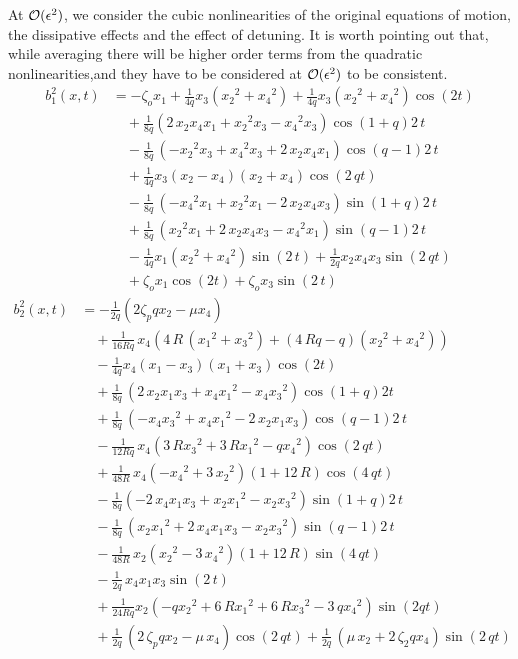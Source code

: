 At $\mathcal{O}(\epsilon^2)$, we consider the cubic nonlinearities of the original equations of motion, the dissipative effects and the effect of detuning. It is worth pointing out that, while averaging there will be higher order terms from the quadratic nonlinearities,and they have to be considered at ${\mathcal{O}}(\epsilon^2)$ to be consistent.
\begin{align*}
b^2_1(x,t) &= -\zeta_o x_1 + \frac{1}{4q} x_3 \left({x_2}^2+{x_4}^2\right) + \frac{1}{4q} {x_3 \left({x_2}^2+{x_4}^2\right)\cos(2t)}\\
&\quad + \frac{1}{8q} {\left(2\,x_2x_4x_1+{x_2}^2 x_3-{x_4}^2 x_3\right) \cos(1 + q)2\,t}\\
&\quad - \frac{1}{8q}\,{ \left(-{x_2}^2 x_3 + {x_4}^2 x_3 + 2\,x_2 x_4 x_1\right) \cos(q-1)2\,t}\\
&\quad + \frac{1}{4q}{x_3 \left(x_2 - x_4\right) \left(x_2 + x_4 \right) \cos(2\,qt)}\\
&\quad - \frac{1}{8q}\,{\left(-{x_4}^2x_1+{x_2}^2x_1 - 2\,x_2 x_4 x_3\right) \sin(1+q)2\,t}\\
&\quad + \frac{1}{8q}\, {\left({x_2}^2 x_1 + 2\, x_2 x_4 x_3 - {x_4}^2x_1\right)\sin(q-1)2\,t}\\
&\quad - \frac{1}{4q} {x_1\left({x_2}^2+{x_4}^2\right)\sin(2\,t)} + \frac{1}{2q} {x_2x_4x_3\sin(2\,qt)}\\
&\quad + \zeta_o x_1\cos(2t) + \zeta_ox_3 \sin(2\,t)
\end{align*}
\begin{align*} 
b^2_2(x,t) &= -\frac{1}{2q} \left({2 \zeta_p q x_2 - \mu x_4}\right)\\
&\quad+\frac{1}{16{Rq}}\,{x_4\left(4\,R \,({x_1}^2 + {x_3}^2) + (4\,Rq - q)({x_2}^2
+ {x_4}^2) \right)}\\
&\quad-\frac{1}{4q}{x_4\left(x_1-x_3\right)\left(x_1 + x_3\right)\cos(2t)}\\
&\quad+\frac{1}{8q}\,{\left(2\,x_2x_1 x_3+x_4{x_1}^2-x_4{x_3}^2\right)\cos(1+q)2t}\\
&\quad+\frac{1}{8q}\,{\left(-x_4{x_3}^2+x_4{x_1}^2 - 2\,x_2x_1x_3\right)\cos(q-1)2\,t}\\
&\quad-\frac{1}{12Rq}\,{ x_4 \left(3\,R{x_3}^2+3\,R{x_1}^2-q{x_4}^2\right)\cos(2\,qt)}\\
&\quad+\frac{1}{48{R}}\,{x_4\left(-{x_4}^2+3\,{x_2}^2\right)\left(1+12\,R\right)\cos(4\,qt)}\\
&\quad-\frac{1}{8q} {\left(-2\,x_4x_1x_3+x_2{x_1}^2-x_2{x_3}^2\right)\sin(1+q)2\,t}\\
&\quad-\frac{1}{8q}\,{\left(x_2{x_1}^2+2\,x_4x_1x_3-x_2{x_3}^2\right)\sin(q-1)2\,t}\\
&\quad-\frac{1}{48{R}}\,{x_2\left({x_2}^2-3\,{x_4}^2\right)\left(1+12\,R\right)\sin(4\,qt)}\\
&\quad-\frac{1}{2q}\,{x_4x_1x_3\sin(2\,t)}\\
&\quad+\frac{1}{24{Rq}} x_2 \left(-q{x_2}^2+6\,R{x_1}^2 + 6\,R{x_3}^2 - 3\,q{x_4}^2\right) \sin(2qt)\\
&\quad+\frac{1}{2q}\,{\left(2\,\zeta_pqx_2-\mu\,x_4 \right) \cos(2\,qt)}+\frac{1}{2q}\,{\left(\mu\,x_2+2\,\zeta_2qx_4\right)\sin(2\,qt)}
\end{align*}
